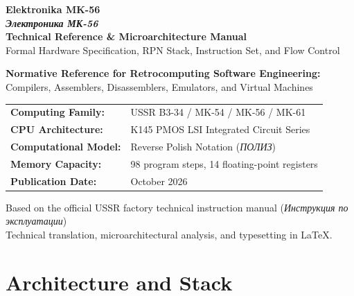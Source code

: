 \documentclass[11pt,a4paper]{article}
\begin{document}
\begin{titlepage}
    \centering
    \vspace*{1.5cm}
    
    {\Huge\bfseries\textcolor{darkslate}{Elektronika MK-56}}\\[0.4cm]
    {\LARGE\textbf{\textit{Электроника МК-56}}}\\[1cm]
    
    {\Large\textcolor{techblue}{\textbf{Technical Reference \& Microarchitecture Manual}}}\\[0.3cm]
    {\large Formal Hardware Specification, RPN Stack, Instruction Set, and Flow Control}\\[1.5cm]
    
    \begin{tcolorbox}[colback=codebg,colframe=darkslate,width=0.88\textwidth,arc=2mm]
    \centering\small\sffamily
    \textbf{Normative Reference for Retrocomputing Software Engineering:}\\
    Compilers, Assemblers, Disassemblers, Emulators, and Virtual Machines
    \end{tcolorbox}
    
    \vspace{2cm}
    
    \begin{tabular}{ll}
        \textbf{Computing Family:}      & USSR B3-34 / MK-54 / MK-56 / MK-61 \\
        \textbf{CPU Architecture:}      & K145 PMOS LSI Integrated Circuit Series \\
        \textbf{Computational Model:}   & Reverse Polish Notation (\textit{ПОЛИЗ}) \\
        \textbf{Memory Capacity:}       & 98 program steps, 14 floating-point registers \\
        \textbf{Publication Date:}      & October 2026 \\
    \end{tabular}

    \vfill
    {\small Based on the official USSR factory technical instruction manual (\textit{Инструкция по эксплуатации})\\
    Technical translation, microarchitectural analysis, and typesetting in \LaTeX.}
\end{titlepage}

\tableofcontents
\newpage

\section{Architecture and Stack}
\end{document}
